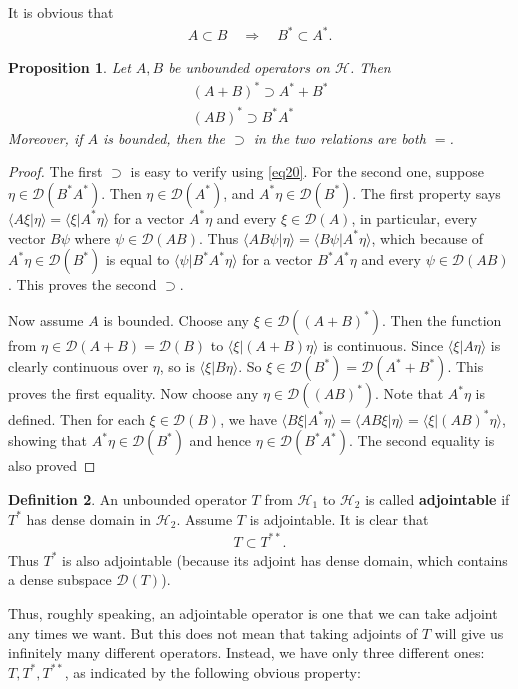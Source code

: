 \documentclass[12pt,a4paper,notitlepage]{article}
\theoremstyle{definition}
\newtheorem{df}{Definition}[section]
\theoremstyle{plain}
\newtheorem{pp}[df]{Proposition}
\newcommand{\mc}{\mathcal}
\newcommand{\Dom}{\scr D}
\newcommand{\bk}[1]{\langle {#1}\rangle}
\newcommand{\scr}{\mathscr}
\numberwithin{equation}{section}
\begin{document}
It is obvious that
\begin{align}
A\subset B\quad\Rightarrow \quad B^*\subset A^*.\label{eq22}
\end{align}

\begin{pp}\label{lb9}
Let $A,B$ be unbounded operators on $\mc H$. Then
\begin{gather*}
(A+B)^*\supset A^*+B^*\\
(AB)^*\supset B^*A^*
\end{gather*}
Moreover, if $A$ is bounded, then the $\supset$ in the two relations are both $=$.
\end{pp}


\begin{proof}
The first $\supset$ is easy to verify using \eqref{eq20}. For the second one, suppose $\eta\in\Dom(B^*A^*)$. Then $\eta\in\Dom(A^*)$, and $A^*\eta\in\Dom(B^*)$. The first property says $\bk{A\xi|\eta}=\bk{\xi|A^*\eta}$ for a vector $A^*\eta$ and every $\xi\in\Dom(A)$, in particular, every vector $B\psi$ where $\psi\in\Dom(AB)$. Thus $\bk{AB\psi|\eta}=\bk{B\psi|A^*\eta}$, which because of $A^*\eta\in\Dom(B^*)$ is equal to $\bk{\psi|B^*A^*\eta}$ for a vector $B^*A^*\eta$ and every $\psi\in\Dom(AB)$. This proves the second $\supset$.

Now assume $A$ is bounded. Choose any $\xi\in\Dom((A+B)^*)$. Then the function from $\eta\in\Dom(A+B)=\Dom(B)$ to $\bk{\xi|(A+B)\eta}$ is continuous. Since $\bk{\xi|A\eta}$ is clearly continuous over $\eta$, so is $\bk{\xi|B\eta}$. So $\xi\in\Dom(B^*)=\Dom(A^*+B^*)$. This proves the first equality. Now choose any $\eta\in\Dom((AB)^*)$. Note that $A^*\eta$ is defined. Then for each  $\xi\in\Dom(B)$, we have $\bk{B\xi|A^*\eta}=\bk{AB\xi|\eta}=\bk{\xi|(AB)^*\eta}$, showing that $A^*\eta\in\Dom(B^*)$ and hence $\eta\in\Dom(B^*A^*)$. The second equality is also proved
\end{proof}




\begin{df}
An unbounded operator $T$ from $\mc H_1$ to $\mc H_2$ is called \textbf{adjointable}  if $T^*$ has dense domain in $\mc H_2$. Assume $T$ is adjointable. It is clear that
\begin{align}
T\subset T^{**}.	
\end{align}
Thus $T^*$ is also adjointable (because its adjoint has dense domain, which contains a dense subspace $\Dom(T)$).
\end{df}

Thus, roughly speaking, an adjointable operator is one that we can take adjoint any times we want. But this does not mean that taking adjoints of $T$ will give us infinitely many different operators. Instead, we have only three different ones: $T,T^*,T^{**}$, as indicated by the following obvious property:
\end{document}
